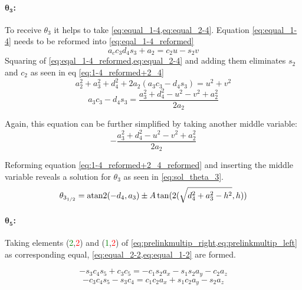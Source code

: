 \paragraph{$\pmb{\theta_3}$:}

To receive $\theta_3$ it helps to take  \cref{eq:equal_1-4,eq:equal_2-4}. Equation \ref{eq:equal_1-4} needs to be reformed into \ref{eq:eqal_1-4_reformed}
\begin{equation} \label{eq:eqal_1-4_reformed}
	a_c c_3 d_4 s_3 + a_2 = c_2 u -s_2 v
\end{equation}
Squaring of \cref{eq:eqal_1-4_reformed,eq:equal_2-4} and adding them eliminates $s_2$ and $c_2$ as seen in eq \ref{eq:1-4_reformed+2_4}
\begin{equation}\label{eq:1-4_reformed+2_4}
	a_2^2 + a_3^2 +d_4^2 + 2 a_2(a_3 c_3 -d_4 s_3) = u^2 + v^2
\end{equation}
\begin{equation}\label{eq:1-4_reformed+2_4_reformed}
	a_3 c_3 - d_4 s_3 = \frac{a_3^2 + d_4^2 - u^2 -v^2 +a_2^2}{2a_2}
\end{equation}

Again, this equation can be further simplified by taking another middle variable:
\begin{equation*}
	-\frac{a_3^2 + d_4^2 - u^2 -v^2 + a_2^2}{2a_2}
\end{equation*}

Reforming equation \ref{eq:1-4_reformed+2_4_reformed} and inserting the middle variable reveals a solution for $\theta_3$ as seen in \cref{eq:sol_theta_3}.
\begin{equation}\label{eq:sol_theta_3}
	\theta_{3_{1/2}} = \operatorname{atan2}(-d_4 , a_3) \pm A \tan (2 (\sqrt{d_4^2 +a_3^2 -h^2} , h))
\end{equation}


\paragraph{$\pmb{\theta_5}$:}
Taking elements (\textcolor{green}{2},\textcolor{red}{2}) and (\textcolor{green}{1},\textcolor{red}{2}) of  \cref{eq:prelinkmultip_right,eq:prelinkmultip_left} as corresponding equal,  \cref{eq:equal_2-2,eq:equal_1-2} are formed.

\begin{equation}\label{eq:equal_2-2}
	-s_3 c_4 s_5 + c_3 c_5 = -c_1 s_2 a_x - s_1 s_2 a_y -c_2 a_z
\end{equation}
\begin{equation}\label{eq:equal_1-2}
	-c_3 c_4 s_5 - s_3 c_4 = c_1 c_2 a_x + s_1 c_2 a_y - s_2 a_z
\end{equation}

